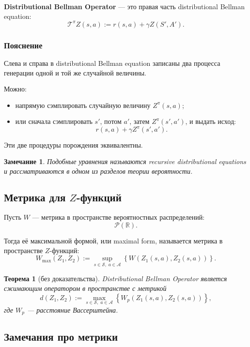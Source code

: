 \documentclass[12pt,a4paper]{article}
\newtheorem{theorem}{Теорема}
\newtheorem{remark}{Замечание}
\begin{document}
\textbf{Distributional Bellman Operator} --- это правая часть distributional Bellman equation:
\[
\mathcal T^\pi Z(s,a)
:=
r(s,a)
+
\gamma Z(S',A').
\]

\subsubsection{Пояснение}

Слева и справа в distributional Bellman equation записаны два процесса генерации одной и той же случайной величины.

Можно:
\begin{itemize}
    \item напрямую сэмплировать случайную величину $Z^\pi(s,a)$;
    \item или сначала сэмплировать $s'$, потом $a'$, затем $Z^\pi(s',a')$, и выдать исход:
    \[
    r(s,a)+\gamma Z^\pi(s',a').
    \]
\end{itemize}

Эти две процедуры порождения эквивалентны.

\begin{remark}
Подобные уравнения называются recursive distributional equations и рассматриваются в одном из разделов теории вероятности.
\end{remark}

\subsection{Метрика для $Z$-функций}

Пусть $W$ --- метрика в пространстве вероятностных распределений:
\[
\mathcal P(\mathbb R).
\]

Тогда её максимальной формой, или maximal form, называется метрика в пространстве $Z$-функций:
\[
W_{\max}(Z_1,Z_2)
:=
\sup_{s \in \mathcal S,\;a \in \mathcal A}
\left\{
W
\left(
Z_1(s,a),
Z_2(s,a)
\right)
\right\}.
\]

\begin{theorem}[без доказательства]
Distributional Bellman Operator является сжимающим оператором в пространстве с метрикой
\[
d(Z_1,Z_2)
:=
\max_{s \in \mathcal S,\;a \in \mathcal A}
\left\{
W_p
\left(
Z_1(s,a),
Z_2(s,a)
\right)
\right\},
\]
где $W_p$ --- расстояние Вассерштейна.
\end{theorem}

\subsection{Замечания про метрики}
\end{document}
